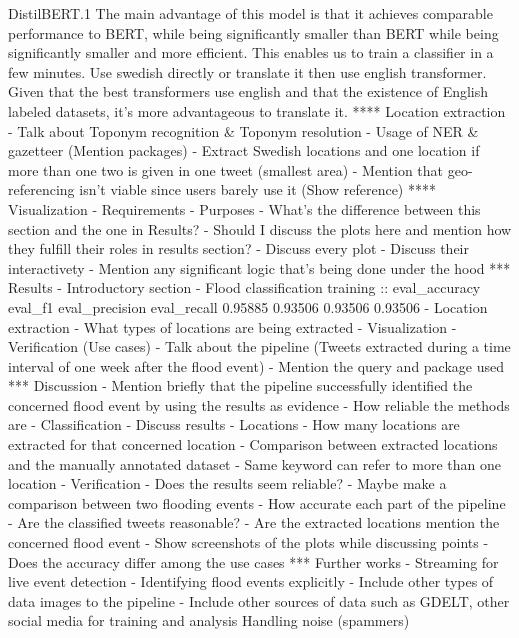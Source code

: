 \documentclass[a4paper, 12pt]{article}
\begin{document}
DistilBERT.1 The main advantage of this model is that it achieves comparable 
performance to BERT,
while being significantly smaller than BERT while being significantly smaller and 
more efficient. 
This enables us to train a classifier in a few minutes.
Use swedish directly or translate it then use english transformer. Given that 
the best transformers use english and that
the existence of English labeled datasets, it's more advantageous to translate it.
**** Location extraction
- Talk about Toponym recognition & Toponym resolution
- Usage of NER & gazetteer (Mention packages)
- Extract Swedish locations and one location if more than one two is given in 
one tweet (smallest area)
- Mention that geo-referencing isn't viable since users barely use it 
(Show reference)
**** Visualization
- Requirements
- Purposes
- What's the difference between this section and the one in Results?
  - Should I discuss the plots here and mention how they fulfill their roles in 
  results section?
- Discuss every plot
- Discuss their interactivety
- Mention any significant logic that's being done under the hood
*** Results
- Introductory section
- Flood classification training ::
  eval_accuracy   eval_f1   eval_precision   eval_recall
  0.95885   0.93506            0.93506       0.93506
- Location extraction
  - What types of locations are being extracted
- Visualization
- Verification (Use cases)
  - Talk about the pipeline (Tweets extracted during a time interval of one week 
  after the flood event)
  - Mention the query and package used
*** Discussion
- Mention briefly that the pipeline successfully identified the concerned 
flood event by using the
  results as evidence
- How reliable the methods are
  - Classification
- Discuss results
  - Locations
    - How many locations are extracted for that concerned location
    - Comparison between extracted locations and the manually annotated dataset
    - Same keyword can refer to more than one location
- Verification
  - Does the results seem reliable?
  - Maybe make a comparison between two flooding events
  - How accurate each part of the pipeline
    - Are the classified tweets reasonable?
    - Are the extracted locations mention the concerned flood event
    - Show screenshots of the plots while discussing points
    - Does the accuracy differ among the use cases
*** Further works
- Streaming for live event detection
- Identifying flood events explicitly
- Include other types of data images to the pipeline
- Include other sources of data such as GDELT, other social media for training 
and analysis Handling noise (spammers)
\end{document}
